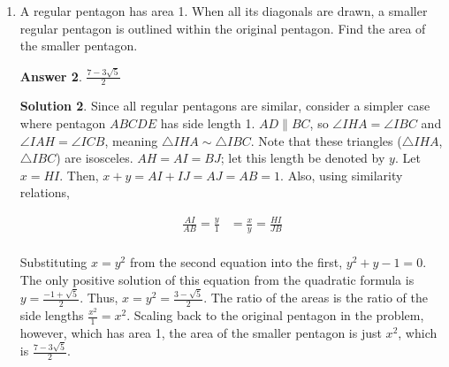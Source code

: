 \documentclass[11pt]{article}
\theoremstyle{definition}
\newtheorem*{solution}{Solution}
\newtheorem*{answer}{Answer}
\begin{document}
\begin{enumerate}
\begin{answer}
7.
\end{answer}
\begin{solution} The problem statement is equivalent to $10n + 1 | 2014n + 47,530$, where the vertical bar indicates divisibity. Then, $10n + 1$ must divide $2014n + 47,530 - 201(10n + 1) = 4n + 47,329$, and also $10(4n + 47,329) = 40n + 473,290$. Subtracting out $40n + 4$, $10n + 1 | 473,286$. Prime factoring 473,268 shows that it equals $2 \cdot 3 \cdot 11 \cdot 71 \cdot 101$. The factors that have a remainder of 1 when divided by 10 are 11, 71, 101, $11 \cdot 71$, $11 \cdot 101$, $71 \cdot 101$, and $11 \cdot 71 \cdot 101$. Because all these can be written as $10n + 1$ for positive integer $n$, there are  possible $n$.

\end{solution}

\item A regular pentagon has area 1. When all its diagonals are drawn, a smaller regular pentagon is outlined within the original pentagon. Find the area of the smaller pentagon.

\begin{answer}
$\displaystyle \frac{7-3\sqrt{5}}{2}$
\end{answer}
\begin{solution}
Since all regular pentagons are similar, consider a simpler case where pentagon $ABCDE$ has side length 1. $AD \parallel BC$, so $\angle IHA = \angle IBC$ and $\angle IAH = \angle ICB$, meaning $\triangle IHA \sim \triangle IBC$. Note that these triangles ($\triangle IHA$, $\triangle IBC$) are isosceles. $AH = AI = BJ$; let this length be denoted by $y$. Let $x = HI$. Then, $x + y = AI + IJ = AJ = AB = 1$. Also, using similarity relations,

\begin{align*}
\frac{AI}{AB} = \frac{y}{1     } &= \frac{x}{y} = \frac{HI}{JB} \\
\end{align*}

Substituting $x = y^2$ from the second equation into the first, $y^2 + y - 1 = 0$. The only positive solution of this equation from the quadratic formula is $y = \frac{-1 + \sqrt{5}}{2}$. Thus, $x = y^2 = \frac{3- \sqrt{5}}{2}$. The ratio of the areas is the ratio of the side lengths $\displaystyle \frac{x^2}{1} = x^2$. Scaling back to the original pentagon in the problem, however, which has area 1, the area of the smaller pentagon is just $x^2$, which is $\boxed{\frac{7 - 3\sqrt{5}}{2}}$.


\end{solution}
\end{enumerate}
\end{document}
